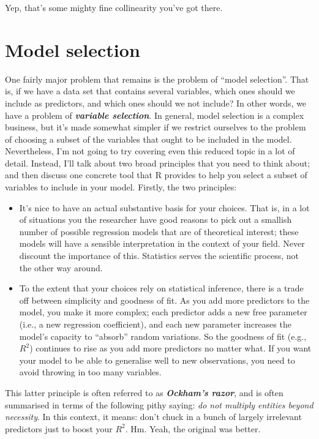 \documentclass[
]{book}
\providecommand{\tightlist}{%
  \setlength{\itemsep}{0pt}\setlength{\parskip}{0pt}}
\begin{document}
Yep, that's some mighty fine collinearity you've got there.

\hypertarget{modelselreg}{%
\section{Model selection}\label{modelselreg}}

One fairly major problem that remains is the problem of ``model selection''. That is, if we have a data set that contains several variables, which ones should we include as predictors, and which ones should we not include? In other words, we have a problem of \textbf{\emph{variable selection}}. In general, model selection is a complex business, but it's made somewhat simpler if we restrict ourselves to the problem of choosing a subset of the variables that ought to be included in the model. Nevertheless, I'm not going to try covering even this reduced topic in a lot of detail. Instead, I'll talk about two broad principles that you need to think about; and then discuss one concrete tool that R provides to help you select a subset of variables to include in your model. Firstly, the two principles:

\begin{itemize}
\tightlist
\item
  It's nice to have an actual substantive basis for your choices. That is, in a lot of situations you the researcher have good reasons to pick out a smallish number of possible regression models that are of theoretical interest; these models will have a sensible interpretation in the context of your field. Never discount the importance of this. Statistics serves the scientific process, not the other way around.
\item
  To the extent that your choices rely on statistical inference, there is a trade off between simplicity and goodness of fit. As you add more predictors to the model, you make it more complex; each predictor adds a new free parameter (i.e., a new regression coefficient), and each new parameter increases the model's capacity to ``absorb'' random variations. So the goodness of fit (e.g., \(R^2\)) continues to rise as you add more predictors no matter what. If you want your model to be able to generalise well to new observations, you need to avoid throwing in too many variables.
\end{itemize}

This latter principle is often referred to as \textbf{\emph{Ockham's razor}}, and is often summarised in terms of the following pithy saying: \emph{do not multiply entities beyond necessity}. In this context, it means: don't chuck in a bunch of largely irrelevant predictors just to boost your \(R^2\). Hm. Yeah, the original was better.
\end{document}
